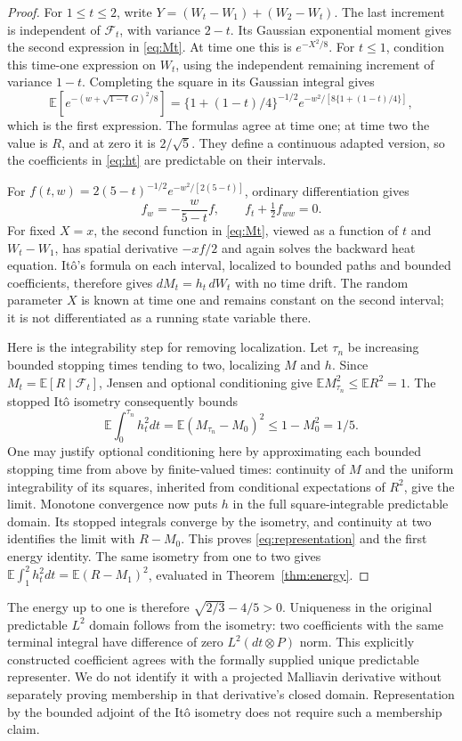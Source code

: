 \documentclass[11pt]{article}
\theoremstyle{remark}\newtheorem{remark}[theorem]{Remark}
\newcommand{\E}{\mathbb E}
\newcommand{\F}{\mathcal F}
\begin{document}
\begin{proof}
For $1\le t\le2$, write $Y=(W_t-W_1)+(W_2-W_t)$. The last increment is independent of $\F_t$, with variance $2-t$. Its Gaussian exponential moment gives the second expression in \eqref{eq:Mt}. At time one this is $e^{-X^2/8}$. For $t\le1$, condition this time-one expression on $W_t$, using the independent remaining increment of variance $1-t$. Completing the square in its Gaussian integral gives
\[
 \E\left[e^{-(w+\sqrt{1-t}\,G)^2/8}\right]
 =\{1+(1-t)/4\}^{-1/2}
   e^{-w^2/[8\{1+(1-t)/4\}]},
\]
which is the first expression. The formulas agree at time one; at time two the value is $R$, and at zero it is $2/\sqrt5$. They define a continuous adapted version, so the coefficients in \eqref{eq:ht} are predictable on their intervals.

For $f(t,w)=2(5-t)^{-1/2}e^{-w^2/[2(5-t)]}$, ordinary differentiation gives
\[
 f_w=-\frac{w}{5-t}f,\qquad f_t+\tfrac12f_{ww}=0.
\]
For fixed $X=x$, the second function in \eqref{eq:Mt}, viewed as a function of $t$ and $W_t-W_1$, has spatial derivative $-xf/2$ and again solves the backward heat equation. It\^o's formula on each interval, localized to bounded paths and bounded coefficients, therefore gives $dM_t=h_t\,dW_t$ with no time drift. The random parameter $X$ is known at time one and remains constant on the second interval; it is not differentiated as a running state variable there.

Here is the integrability step for removing localization. Let $\tau_n$ be increasing bounded stopping times tending to two, localizing $M$ and $h$. Since $M_t=\E[R\mid\F_t]$, Jensen and optional conditioning give $\E M_{\tau_n}^2\le\E R^2=1$. The stopped It\^o isometry consequently bounds
\[
 \E\int_0^{\tau_n}h_t^2dt
 =\E(M_{\tau_n}-M_0)^2\le1-M_0^2=1/5.
\]
One may justify optional conditioning here by approximating each bounded stopping time from above by finite-valued times: continuity of $M$ and the uniform integrability of its squares, inherited from conditional expectations of $R^2$, give the limit. Monotone convergence now puts $h$ in the full square-integrable predictable domain. Its stopped integrals converge by the isometry, and continuity at two identifies the limit with $R-M_0$. This proves \eqref{eq:representation} and the first energy identity. The same isometry from one to two gives
$\E\int_1^2h_t^2dt=\E(R-M_1)^2$, evaluated in Theorem~\ref{thm:energy}.
\end{proof}

The energy up to one is therefore $\sqrt{2/3}-4/5>0$. Uniqueness in the original predictable $L^2$ domain follows from the isometry: two coefficients with the same terminal integral have difference of zero $L^2(dt\otimes P)$ norm. This explicitly constructed coefficient agrees with the formally supplied unique predictable representer. We do not identify it with a projected Malliavin derivative without separately proving membership in that derivative's closed domain. Representation by the bounded adjoint of the It\^o isometry does not require such a membership claim.
\end{document}
